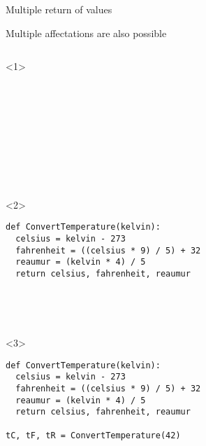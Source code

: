 \begin{frame}[fragile]{Multiple return of values}

  Multiple affectations are also possible

  \begin{columns}[onlytextwidth]
    \begin{column}{\textwidth}

      \begin{onlyenv}<1>
        \begin{lstlisting}[style=python]










 \end{lstlisting}
      \end{onlyenv}

      \begin{onlyenv}<2>
        \begin{lstlisting}[style=python]
def ConvertTemperature(kelvin):
  celsius = kelvin - 273
  fahrenheit = ((celsius * 9) / 5) + 32
  reaumur = (kelvin * 4) / 5
  return celsius, fahrenheit, reaumur





 \end{lstlisting}
      \end{onlyenv}

      \begin{onlyenv}<3>
        \begin{lstlisting}[style=python]
def ConvertTemperature(kelvin):
  celsius = kelvin - 273
  fahrenheit = ((celsius * 9) / 5) + 32
  reaumur = (kelvin * 4) / 5
  return celsius, fahrenheit, reaumur

tC, tF, tR = ConvertTemperature(42)



 \end{lstlisting}
      \end{onlyenv}



\end{column}
\end{columns}
\end{frame}
